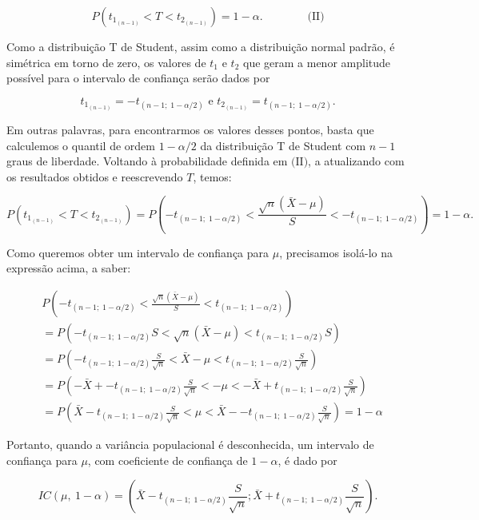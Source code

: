 \documentclass[
  letterpaper,
  DIV=11,
  numbers=noendperiod]{scrreprt}
\begin{document}
\[
P\left(t_{1_{(n-1)}} < T < t_{2_{(n-1)}} \right) = 1 - \alpha. \qquad \qquad \text{(II)}
\]

Como a distribuição T de Student, assim como a distribuição normal
padrão, é simétrica em torno de zero, os valores de \(t_1\) e \(t_2\)
que geram a menor amplitude possível para o intervalo de confiança serão
dados por

\[
t_{1_{(n-1)}} = -t_{(n - 1;\;1 -\alpha/2)} \text{ e } t_{2_{(n-1)}} = t_{(n - 1;\;1 -\alpha/2)}.
\]

Em outras palavras, para encontrarmos os valores desses pontos, basta
que calculemos o quantil de ordem \(1 - \alpha/2\) da distribuição T de
Student com \(n - 1\) graus de liberdade. Voltando à probabilidade
definida em \(\text{(II)}\), a atualizando com os resultados obtidos e
reescrevendo \(T\), temos:

\[
P\left(t_{1_{(n-1)}} < T < t_{2_{(n-1)}} \right) = P\left(-t_{(n - 1;\;1 -\alpha/2)} < \frac{\sqrt{n}\left(\bar{X} - \mu\right)}{S} < -t_{(n - 1;\;1 -\alpha/2)} \right) = 1 - \alpha.
\]

Como queremos obter um intervalo de confiança para \(\mu\), precisamos
isolá-lo na expressão acima, a saber:

\[
\begin{align}
& P\left(-t_{(n - 1;\;1 -\alpha/2)} < \frac{\sqrt{n}\left(\bar{X} - \mu\right)}{S} < t_{(n - 1;\;1 -\alpha/2)} \right) \\ & 
= P\left(-t_{(n - 1;\;1 -\alpha/2)} S < \sqrt{n}\left(\bar{X} - \mu\right) < t_{(n - 1;\;1 -\alpha/2)} S\right) \\ & = 
P\left(-t_{(n - 1;\;1 -\alpha/2)} \frac{S}{\sqrt{n}} < \bar{X} - \mu < t_{(n - 1;\;1 -\alpha/2)} \frac{S}{\sqrt{n}} \right) \\ & = 
P\left(-\bar{X} + -t_{(n - 1;\;1 -\alpha/2)} \frac{S}{\sqrt{n}} < - \mu < -\bar{X} + t_{(n - 1;\;1 -\alpha/2)} \frac{S}{\sqrt{n}} \right) \\ & 
= P\left(\bar{X} - t_{(n - 1;\;1 -\alpha/2)} \frac{S}{\sqrt{n}} < \mu < \bar{X} - -t_{(n - 1;\;1 -\alpha/2)} \frac{S}{\sqrt{n}} \right) = 1 - \alpha
\end{align} 
\]

Portanto, quando a variância populacional é desconhecida, um intervalo
de confiança para \(\mu\), com coeficiente de confiança de
\(1 - \alpha\), é dado por

\[
IC(\mu,\ 1 - \alpha) = \left(\bar{X} - t_{(n-1;\;1 - \alpha/2)} \frac{S}{\sqrt{n}}; \bar{X} + t_{(n-1;\;1 - \alpha/2)} \frac{S}{\sqrt{n}} \right).
\]
\end{document}
